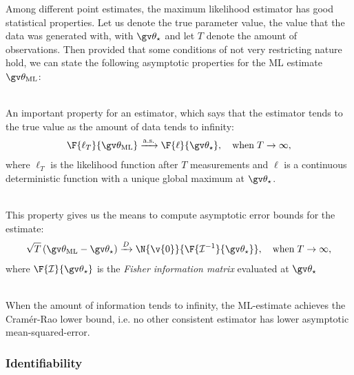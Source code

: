 Among different point estimates, the maximum likelihood estimator has good statistical properties.
Let us denote the true parameter value, the value that the data was generated with, with $\Th_\star$ and 
let $T$ denote the amount of observations.
Then provided that some conditions of not very restricting nature hold, we can state the following asymptotic properties 
for the ML estimate $\Th_{\text{ML}}$:
\begin{description}
\addtolength{\leftskip}{1cm}
\item[Strong consistency]\hfill\\
An important property for an estimator, which says that
the estimator tends to the true value as the amount of data tends to infinity:
\begin{align}
	\F{\ell_T}{\Th_{\text{ML}}} \xrightarrow{\mathrm{a.s.}} \F{\ell}{\Th_\star},\quad \mathrm{when}\;T\to\infty,
\end{align}
where $\ell_T$ is the likelihood function after $T$ measurements and $\ell$ is a continuous
deterministic function with a unique global maximum at $\Th_\star$.
\item[Asymptotic normality]\hfill\\
This property gives us the means to compute asymptotic error bounds for
the estimate:
\begin{align}
	\sqrt{T}\left(\Th_{\text{ML}}-\Th_\star\right) \xrightarrow{D} \N{\v{0}}{\F{\mathcal{I}^{-1}}{\Th_\star}},\quad \mathrm{when}\;T\to\infty,	
\end{align}
where $\F{\mathcal{I}}{\Th_\star}$ is the \emph{Fisher information matrix} evaluated at $\Th_\star$ 
\item[Efficiency]\hfill\\
When the amount of information tends to infinity, the ML-estimate achieves
the Cramér-Rao lower bound, i.e. no other consistent estimator has lower asymptotic mean-squared-error.
\end{description}


\subsubsection{Identifiability}

